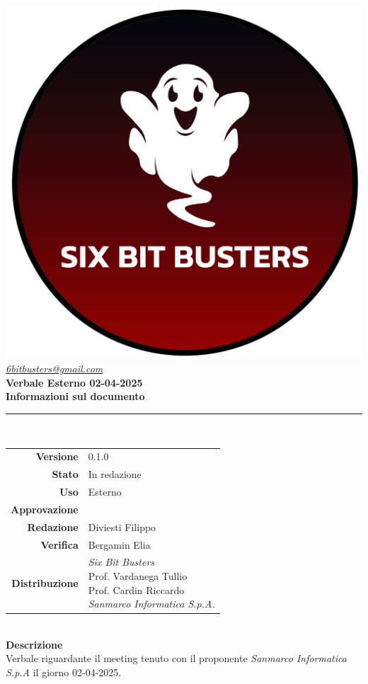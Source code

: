\thispagestyle{empty}
\renewcommand{\arraystretch}{1.3}


\begin{titlepage}
	\begin{center}
		
	\includegraphics[scale = 0.7]{template/images/logo-circle.png}
	\\[1cm]
	\href{mailto:6bitbusters@gmail.com}		      	
	{\large{\textit{6bitbusters@gmail.com} } }\\[1cm]
	
	\Huge \textbf{Verbale Esterno 02-04-2025} \\[1cm]

	\large \textbf{Informazioni sul documento} \\
	\rule{0.6\textwidth}{0.4pt}
	\\[0.5cm]
	\begin{tabular}{r|l}
		\textbf{Versione} & 0.1.0\\
		\textbf{Stato} & In redazione\\
		\textbf{Uso} & Esterno\\                         
		\textbf{Approvazione} & \\                      
		\textbf{Redazione} & Diviesti Filippo\\ 
		\textbf{Verifica} & Bergamin Elia\\                         
		\textbf{Distribuzione} & \parbox[t]{6cm}{ \textit{Six Bit Busters} \\ Prof. Vardanega Tullio 
	 \\ Prof. Cardin Riccardo \\ \textit{Sanmarco Informatica S.p.A.}} 
	\end{tabular}	
	\\[1.2cm]

	\large \textbf{Descrizione} \\
	Verbale riguardante il meeting tenuto con il proponente \textit{Sanmarco Informatica S.p.A} il giorno 02-04-2025.
	
	\end{center}
\end{titlepage}
